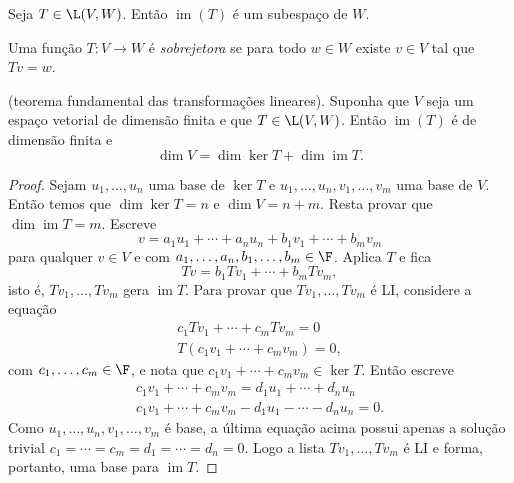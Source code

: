 \documentclass{article}
\DeclareMathOperator{\im}{im}
\begin{document}
\begin{prop}
    Seja \(T \in \L(V, W)\). Então \(\im(T)\) é um subespaço de \(W\).
\end{prop}

\begin{defn}
    Uma função \(T: V \to W\) é \emph{sobrejetora} se para todo \(w \in W\) existe \(v \in V\) tal que \(Tv = w\).
\end{defn}

\begin{thm} (teorema fundamental das transformações lineares).
    Suponha que \(V\) seja um espaço vetorial de dimensão finita e que \(T \in \L(V, W)\). Então \(\im(T)\) é de dimensão finita e
    \begin{equation}
        \dim V = \dim \ker T + \dim \im T.
    \end{equation}
\end{thm}

\begin{proof}
    Sejam \(u_1, \ldots, u_n\) uma base de \(\ker T\) e \(u_1, \ldots, u_n, v_1, \ldots, v_m\) uma base de \(V\). Então temos que \(\dim \ker T = n\) e \(\dim V = n+m\). Resta provar que \(\dim \im T = m\).
    Escreve
    \[
        v = a_1 u_1 + \cdots + a_n u_n + b_1 v_1 + \cdots + b_m v_m
    \]
    \noindent para qualquer \(v \in V\) e com \(a_1, \ldots, a_n, b_1, \ldots, b_m \in \F\). Aplica \(T\) e fica 
    \[
        Tv = b_1 Tv_1 + \cdots + b_m Tv_m ,
    \]
    \noindent isto é, \(Tv_1, \ldots, Tv_m\) gera \(\im T\). Para provar que \(Tv_1, \ldots, Tv_m\) é LI, considere a equação
    \begin{gather}
        c_1 Tv_1 + \cdots + c_m Tv_m = 0 \\
        T(c_1 v_1 + \cdots + c_m v_m) = 0,
    \end{gather}
    \noindent com \(c_1, \ldots, c_m \in \F\), e nota que \(c_1 v_1 + \cdots + c_m v_m \in \ker T\). Então escreve 
    \begin{gather}
        c_1 v_1 + \cdots + c_m v_m = d_1 u_1 + \cdots + d_n u_n \\
        c_1 v_1 + \cdots + c_m v_m - d_1 u_1 - \cdots - d_n u_n = 0.
    \end{gather}
    Como \(u_1, \ldots, u_n, v_1, \ldots, v_m\) é base, a última equação acima possui apenas a solução trivial \(c_1 = \cdots = c_m = d_1 = \cdots = d_n = 0\). Logo a lista \(Tv_1, \ldots, Tv_m\) é LI e forma, portanto, uma base para \(\im T\).
\end{proof}
\end{document}
